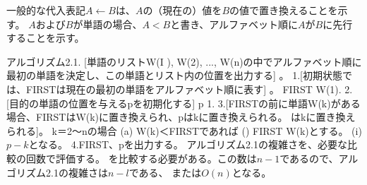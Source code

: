 
一般的な代入表記$A \leftarrow  B$は、$A$の（現在の）値を$B$の値で置き換えることを示す。
$A$および$B$が単語の場合、$A < B$と書き、アルファベット順に$A$が$B$に先行することを示す。

アルゴリズム2.1.
[単語のリストW(I ), W(2), ..., W(n)の中でアルファベット順に最初の単語を決定し、この単語とリスト内の位置を出力する] 。
1.[初期状態では、FIRSTは現在の最初の単語をアルファベット順に表す] 。
FIRST W(1).
2.[目的の単語の位置を与えるpを初期化する] p 1.
3.[FIRSTの前に単語W(k)がある場合、FIRSTはW(k)に置き換えられ、pはkに置き換えられる。
はkに置き換えられる]。
k＝2〜nの場合
(a) W(k)＜FIRSTであれば
() FIRST W(k)とする。
(i) $p-k$となる。
4.FIRST、pを出力する。
アルゴリズム2.1の複雑さを、必要な比較の回数で評価する。
を比較する必要がある。この数は$n-1$であるので、アルゴリズム2.1の複雑さは$n-l$である、
または$O(n)$となる。